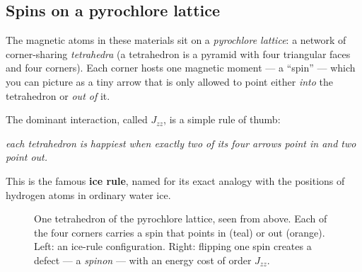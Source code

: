\documentclass[11pt,a4paper]{article}
\newcommand{\Jzz}{J_{zz}}
\begin{document}
\subsection{Spins on a pyrochlore lattice}

The magnetic atoms in these materials sit on a \emph{pyrochlore lattice}: a
network of corner-sharing \emph{tetrahedra} (a tetrahedron is a pyramid with
four triangular faces and four corners).  Each corner hosts one magnetic
moment --- a ``spin'' --- which you can picture as a tiny arrow that is only
allowed to point either \emph{into} the tetrahedron or \emph{out of} it.

The dominant interaction, called $\Jzz$, is a simple rule of thumb:
\begin{center}
\emph{each tetrahedron is happiest when exactly two of its four arrows point
in and two point out.}
\end{center}
This is the famous \textbf{ice rule}, named for its exact analogy with the
positions of hydrogen atoms in ordinary water ice.

\begin{figure}[h]
\centering
{}
\caption{One tetrahedron of the pyrochlore lattice, seen from above.  Each of
the four corners carries a spin that points in (teal) or out (orange).
Left: an ice-rule configuration.  Right: flipping one spin creates a defect
--- a \emph{spinon} --- with an energy cost of order $\Jzz$.}
\label{fig:icerule}
\end{figure}
\end{document}
